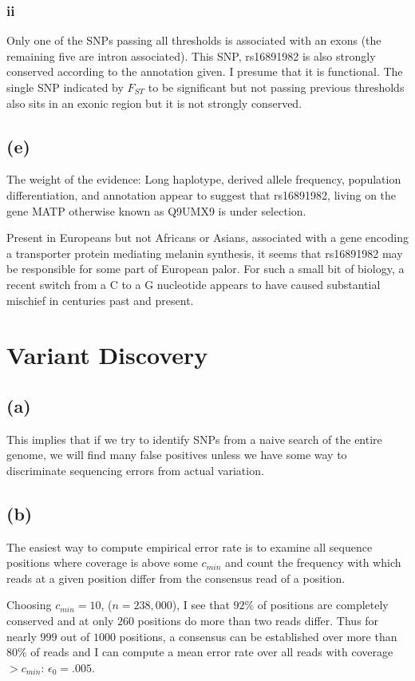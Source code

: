 \documentclass[12pt,draft,a4paper]{article}
\begin{document}
\subsubsection*{ii}
Only one of the SNPs passing all thresholds is associated with an exons (the remaining five are intron associated). This SNP, rs16891982 is also strongly conserved according to the annotation given. I presume that it is functional. The single SNP indicated by $F_{ST}$ to be significant but not passing previous thresholds also sits in an exonic region but it is not strongly conserved.
\subsection*{(e)}
The weight of the evidence: Long haplotype, derived allele frequency, population differentiation, and annotation appear to suggest that rs16891982, living on the gene MATP otherwise known as Q9UMX9 is under selection.


Present in Europeans but not Africans or Asians, associated with a gene encoding a transporter protein mediating melanin synthesis, it seems that rs16891982 may be responsible for some part of European palor. For such a small bit of biology, a recent switch from a C to a G nucleotide appears to have caused substantial mischief in centuries past and present.

\pagebreak
\section{Variant Discovery}
\subsection*{(a)}
This implies that if we try to identify SNPs from a naive search of the entire genome, we will find many false positives unless we have some way to discriminate sequencing errors from actual variation.
\subsection*{(b)}
The easiest way to compute empirical error rate is to examine all sequence positions where coverage is above some $c_{min}$ and count the frequency with which reads at a given position differ from the consensus read of a position.

Choosing $c_{min} = 10$, ($n=238,000$), I see that $92\%$ of positions are completely conserved and at only $260$ positions do more than two reads differ. Thus for nearly $999$ out of $1000$ positions, a consensus can be established over more than $80\%$ of reads and I can compute a mean error rate over all reads with coverage $>c_{min}$: $\epsilon_0 = .005$.
\end{document}
